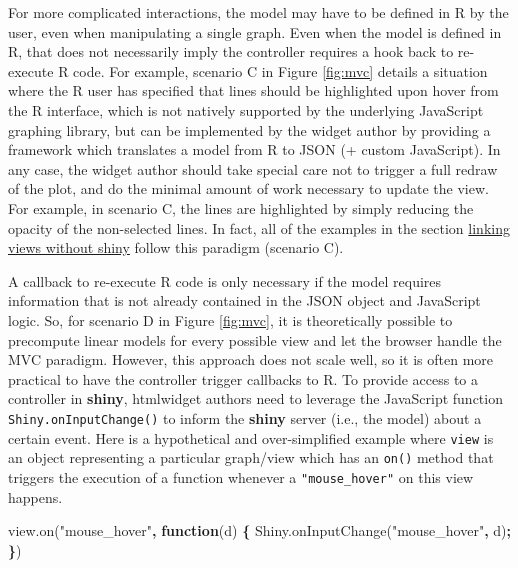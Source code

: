 \documentclass[12pt,]{isuthesis}
\newenvironment{Shaded}{\begin{snugshade}}{\end{snugshade}}
\newcommand{\KeywordTok}[1]{\textcolor[rgb]{0.13,0.29,0.53}{\textbf{{#1}}}}
\newcommand{\StringTok}[1]{\textcolor[rgb]{0.31,0.60,0.02}{{#1}}}
\newcommand{\VariableTok}[1]{\textcolor[rgb]{0.00,0.00,0.00}{{#1}}}
\newcommand{\OperatorTok}[1]{\textcolor[rgb]{0.81,0.36,0.00}{\textbf{{#1}}}}
\newcommand{\AttributeTok}[1]{\textcolor[rgb]{0.77,0.63,0.00}{{#1}}}
\newcommand{\NormalTok}[1]{{#1}}
\begin{document}
For more complicated interactions, the model may have to be defined in R
by the user, even when manipulating a single graph. Even when the model
is defined in R, that does not necessarily imply the controller requires
a hook back to re-execute R code. For example, scenario C in Figure
\ref{fig:mvc} details a situation where the R user has specified that
lines should be highlighted upon hover from the R interface, which is
not natively supported by the underlying JavaScript graphing library,
but can be implemented by the widget author by providing a framework
which translates a model from R to JSON (+ custom JavaScript). In any
case, the widget author should take special care not to trigger a full
redraw of the plot, and do the minimal amount of work necessary to
update the view. For example, in scenario C, the lines are highlighted
by simply reducing the opacity of the non-selected lines. In fact, all
of the examples in the section
\protect\hyperlink{linking-views-without-shiny}{linking views without
shiny} follow this paradigm (scenario C).

A callback to re-execute R code is only necessary if the model requires
information that is not already contained in the JSON object and
JavaScript logic. So, for scenario D in Figure \ref{fig:mvc}, it is
theoretically possible to precompute linear models for every possible
view and let the browser handle the MVC paradigm. However, this approach
does not scale well, so it is often more practical to have the
controller trigger callbacks to R. To provide access to a controller in
\textbf{shiny}, htmlwidget authors need to leverage the JavaScript
function \texttt{Shiny.onInputChange()} to inform the \textbf{shiny}
server (i.e., the model) about a certain event. Here is a hypothetical
and over-simplified example where \texttt{view} is an object
representing a particular graph/view which has an \texttt{on()} method
that triggers the execution of a function whenever a
\texttt{"mouse\_hover"} on this view happens.

\begin{Shaded}
\begin{Highlighting}[]
\VariableTok{view}\NormalTok{.}\AttributeTok{on}\NormalTok{(}\StringTok{"mouse_hover"}\OperatorTok{,} \KeywordTok{function}\NormalTok{(d) }\OperatorTok{\{}
  \VariableTok{Shiny}\NormalTok{.}\AttributeTok{onInputChange}\NormalTok{(}\StringTok{"mouse_hover"}\OperatorTok{,} \NormalTok{d)}\OperatorTok{;}
\OperatorTok{\}}\NormalTok{)}
\end{Highlighting}
\end{Shaded}
\end{document}
